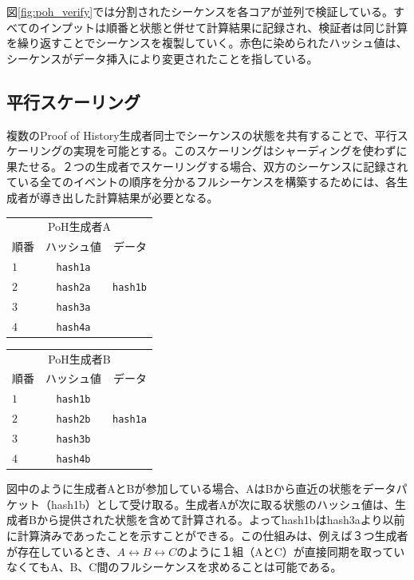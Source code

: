 \documentclass[12pt]{ltjsarticle}
\begin{document}
図\ref{fig:poh_verify}では分割されたシーケンスを各コアが並列で検証している。すべてのインプットは順番と状態と併せて計算結果に記録され、検証者は同じ計算を繰り返すことでシーケンスを複製していく。赤色に染められたハッシュ値は、シーケンスがデータ挿入により変更されたことを指している。

\subsection{平行スケーリング}\label{poh:scale}
複数のProof of History生成者同士でシーケンスの状態を共有することで、平行スケーリングの実現を可能とする。このスケーリングはシャーディングを使わずに果たせる。２つの生成者でスケーリングする場合、双方のシーケンスに記録されている全てのイベントの順序を分かるフルシーケンスを構築するためには、各生成者が導き出した計算結果が必要となる。

\begin{center}
  \begin{tabular}{|l c r|}

  \hline
    \multicolumn{3}{|c|}{PoH生成者A} \\
    順番  & ハッシュ値 & データ \\ \hline
    $1$ & \texttt{hash1a} & \\ 
    $2$ & \texttt{hash2a} & \texttt{hash1b} \\ 
    $3$ & \texttt{hash3a} & \\ 
    $4$ & \texttt{hash4a} & \\
    \hline
    \end{tabular}
  \begin{tabular}{| l  c  r |}
  \hline
    \multicolumn{3}{|c|}{PoH生成者B} \\
    順番  & ハッシュ値 & データ \\ \hline
    $1$ & \texttt{hash1b} & \\ 
    $2$ & \texttt{hash2b} & \texttt{hash1a} \\ 
    $3$ & \texttt{hash3b} & \\ 
    $4$ & \texttt{hash4b} & \\
    \hline
    \end{tabular}
\end{center}

図中のように生成者AとBが参加している場合、AはBから直近の状態をデータパケット（hash1b）として受け取る。生成者Aが次に取る状態のハッシュ値は、生成者Bから提供された状態を含めて計算される。よってhash1bはhash3aより以前に計算済みであったことを示すことができる。この仕組みは、例えば３つ生成者が存在しているとき、\(A \leftrightarrow B \leftrightarrow C\)のように１組（AとC）が直接同期を取っていなくてもA、B、C間のフルシーケンスを求めることは可能である。
\end{document}
